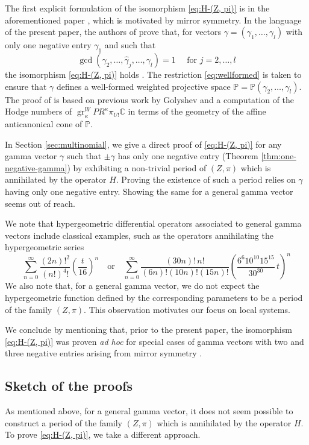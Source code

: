 \documentclass[11pt, reqno]{amsart}
\theoremstyle{plain}
\theoremstyle{definition}
\newcommand{\PP}{\mathbb{P}}
\newcommand{\CC}{\mathbb{C}}
\DeclareMathOperator{\gr}{gr}
\begin{document}
The first explicit formulation of the isomorphism \eqref{eq:H-(Z, pi)} is in the aforementioned paper \cite{AG}, which is motivated by mirror symmetry.
In the language of the present paper, the authors of \cite{AG} prove that, for vectors $\gamma=(\gamma_1, \dots, \gamma_l)$ with only one negative entry $\gamma_1$  and such that 
\begin{equation}  \label{eq:wellformed}   \gcd(\gamma_2, \dots ,\widehat{\gamma}_j ,\dots, \gamma_l)=1 \quad \text{ for } j=2, \dots,l \end{equation}
the isomorphism \eqref{eq:H-(Z, pi)} holds \cite[Theorem 1.1]{AG}. 
The restriction \eqref{eq:wellformed} is taken to ensure that $\gamma$ defines a well-formed weighted projective space $\PP=\PP(\gamma_2, \dots, \gamma_l)$.
The proof of \cite[Theorem 1.1]{AG} is based on previous work by Golyshev \cite{Vasily} and a computation of the Hodge numbers of $\gr_\kappa^W PR^\kappa \pi_{U !} \CC$
in terms of the geometry of the affine anticanonical cone of $\PP$. 

In Section \ref{sec:multinomial}, we give a direct proof of  \eqref{eq:H-(Z, pi)} for any gamma vector $\gamma$ such that $\pm \gamma$ has only one negative entry (Theorem \ref{thm:one-negative-gamma})
by exhibiting a non-trivial period of $(Z, \pi)$ 
which is annihilated by the operator $H$. 
Proving the existence of such a period relies on $\gamma$ having only one negative entry. Showing the same for a general gamma vector seems out of reach.  

We note that hypergeometric differential operators associated to general gamma vectors include classical examples, such as the operators annihilating the hypergeometric series 
\[
\sum_{n=0}^\infty \frac{(2n)!^2}{(n!)^4!}\left(\frac{t}{16}\right)^n
\quad\text{or}\quad
\sum_{n=0}^\infty
\frac{(30n)!\,n!}{(6n)!(10n)!(15n)!}
\left(\frac{6^6 10^{10} 15^{15}}{30^{30}}\, t\right)^n 
\]
We also note that, for a general gamma vector, we do not expect the hypergeometric function defined by the corresponding parameters to be a period of the family $(Z,\pi)$. This observation motivates our focus on local systems.  

We conclude by mentioning that, prior to the present paper, the isomorphism \eqref{eq:H-(Z, pi)} was proven \emph{ad hoc} for special cases of gamma vectors with two and three negative entries arising from mirror symmetry \cite{Orbi, AlessioG, ThesisG, ACGGFRV}. 




\subsection{Sketch of the proofs}
\label{sec:notes-proof}
As mentioned above, for a general gamma vector, it does not seem possible to construct a period of the family $(Z,\pi)$ which is annihilated by the operator $H$. To prove \eqref{eq:H-(Z, pi)}, we take a different approach. 
\end{document}
